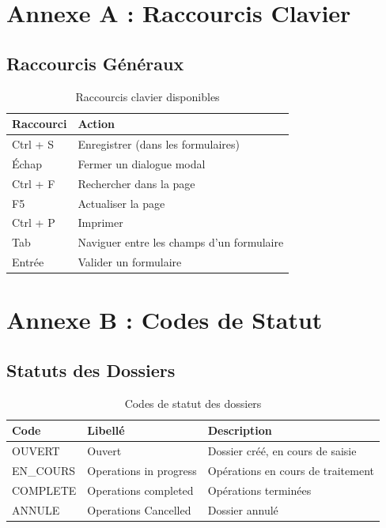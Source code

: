 \documentclass[12pt,a4paper]{report}
\begin{document}
\appendix

\chapter{Annexe A : Raccourcis Clavier}

\section{Raccourcis Généraux}

\begin{table}[H]
\centering
\begin{tabular}{|l|p{8cm}|}
\hline
\textbf{Raccourci} & \textbf{Action} \\
\hline
Ctrl + S & Enregistrer (dans les formulaires) \\
\hline
Échap & Fermer un dialogue modal \\
\hline
Ctrl + F & Rechercher dans la page \\
\hline
F5 & Actualiser la page \\
\hline
Ctrl + P & Imprimer \\
\hline
Tab & Naviguer entre les champs d'un formulaire \\
\hline
Entrée & Valider un formulaire \\
\hline
\end{tabular}
\caption{Raccourcis clavier disponibles}
\end{table}

\chapter{Annexe B : Codes de Statut}

\section{Statuts des Dossiers}

\begin{table}[H]
\centering
\begin{tabular}{|l|l|p{6cm}|}
\hline
\textbf{Code} & \textbf{Libellé} & \textbf{Description} \\
\hline
OUVERT & Ouvert & Dossier créé, en cours de saisie \\
\hline
EN\_COURS & Operations in progress & Opérations en cours de traitement \\
\hline
COMPLETE & Operations completed & Opérations terminées \\
\hline
ANNULE & Operations Cancelled & Dossier annulé \\
\hline
\end{tabular}
\caption{Codes de statut des dossiers}
\end{table}
\end{document}
